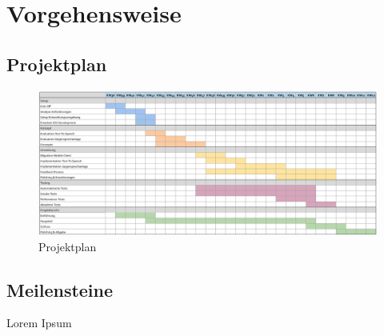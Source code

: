 \section{Vorgehensweise}

\subsection*{Projektplan}

\begin{figure}[h]
    \centering
    \begin{minipage}[b]{\textwidth}
        \includegraphics[width=\textwidth]{graphics/projektplan}
        \caption{Projektplan}
    \end{minipage}\label{fig:projektplan}
\end{figure}


\subsection*{Meilensteine}

Lorem Ipsum

\clearpage
